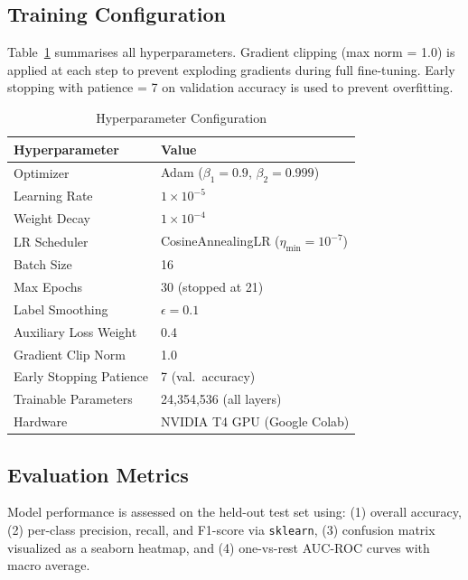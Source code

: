 \documentclass[conference]{IEEEtran}
\begin{document}
\subsection{Training Configuration}

Table~\ref{tab:hyper} summarises all hyperparameters. Gradient clipping (max norm = 1.0) is applied at each step to prevent exploding gradients during full fine-tuning. Early stopping with patience = 7 on validation accuracy is used to prevent overfitting.

\begin{table}[!h]
  \caption{Hyperparameter Configuration}
  \label{tab:hyper}
  \centering
  \renewcommand{\arraystretch}{1.25}
  \begin{tabular}{ll}
    \toprule
    \textbf{Hyperparameter} & \textbf{Value} \\
    \midrule
    Optimizer               & Adam ($\beta_1=0.9$, $\beta_2=0.999$) \\
    Learning Rate           & $1 \times 10^{-5}$ \\
    Weight Decay            & $1 \times 10^{-4}$ \\
    LR Scheduler            & CosineAnnealingLR ($\eta_{\min} = 10^{-7}$) \\
    Batch Size              & 16 \\
    Max Epochs              & 30 (stopped at 21) \\
    Label Smoothing         & $\epsilon = 0.1$ \\
    Auxiliary Loss Weight   & 0.4 \\
    Gradient Clip Norm      & 1.0 \\
    Early Stopping Patience & 7 (val.\ accuracy) \\
    Trainable Parameters    & 24,354,536 (all layers) \\
    Hardware                & NVIDIA T4 GPU (Google Colab) \\
    \bottomrule
  \end{tabular}
\end{table}

\subsection{Evaluation Metrics}

Model performance is assessed on the held-out test set using: (1) overall accuracy, (2) per-class precision, recall, and F1-score via \texttt{sklearn}, (3) confusion matrix visualized as a seaborn heatmap, and (4) one-vs-rest AUC-ROC curves with macro average.
\end{document}
